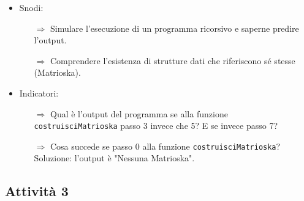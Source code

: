 \begin{itemize}
    \item Snodi:
    \begin{itemize}
        \item [$\Rightarrow$] Simulare l'esecuzione di un programma ricorsivo e saperne predire l'output.
        \item [$\Rightarrow$] Comprendere l'esistenza di strutture dati che riferiscono sé stesse (Matrioska).
    \end{itemize}
    \item Indicatori:
    \begin{itemize}
        \item [$\Rightarrow$] Qual è l'output del programma se alla funzione \texttt{costruisciMatrioska} 
        passo 3 invece che 5? E se invece passo 7?
        \item [$\Rightarrow$] Cosa succede se passo 0 alla funzione \texttt{costruisciMatrioska}? Soluzione: l'output è "Nessuna Matrioska".
    \end{itemize}
\end{itemize}

\subsection{Attività 3}

\paragraph{}

